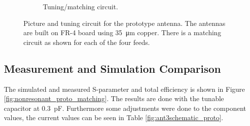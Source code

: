 \begin{figure}[htbp]
\begin{subfigure}[b]{0.49\linewidth}
        \caption{Tuning/matching circuit.}
        \label{fig:ant3schematic}
    \end{subfigure}
    \caption{Picture and tuning circuit for the prototype antenna.  The antennas are built on FR-4 board using \SI{35}{\micro\meter} copper. There is a matching circuit as shown for each of the four feeds.}
    \label{fig:ant3techschem_proto}
\end{figure}


\subsection{Measurement and Simulation Comparison}
The simulated and measured S-parameter and total efficiency is shown in Figure \ref{fig:nonresonant_proto_matching}. The results are done with the tunable capacitor at \SI{0.3}{pF}. Furthermore some adjustments were done to the component values, the current values can be seen in Table \ref{fig:ant3schematic_proto}. 

